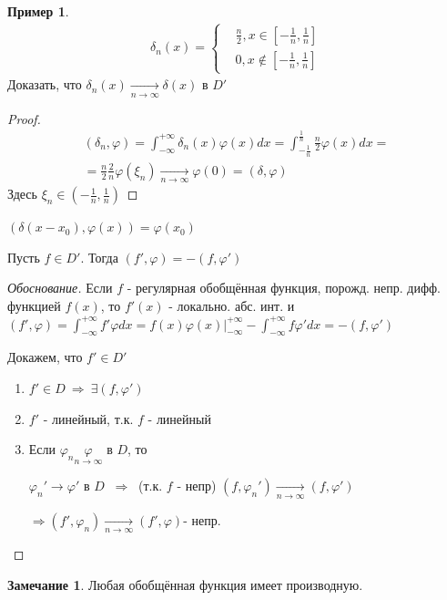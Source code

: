 \documentclass{article}
\theoremstyle{definition}
\numberwithin{theorem}{section}
\numberwithin{lemma}{section}
\numberwithin{definition}{section}
\numberwithin{corollary}{section}
\newtheorem*{eg}{Пример}
\newtheorem*{remark}{Замечание}
\numberwithin{equation}{section}
\let\phi\varphi
\let\implies\Rightarrow
\begin{document}
\begin{eg}
  \begin{gather*}
    \delta_n(x)=\left\{\begin{aligned}
      & \frac{n}{2}, x \in [-\frac{1}{n},\frac{1}{n}] \\ 
      & 0, x \not \in [-\frac{1}{n},\frac{1}{n}]
    \end{aligned}\right.
  \end{gather*}
  Доказать, что $\delta_n(x) \underset{n\to\infty}{\to}\delta(x)$ в $D'$
  \begin{proof}
    \begin{gather*}
      (\delta_n,\phi)=\int_{-\infty}^{+\infty}\delta_n(x)\phi(x)dx=\int_{-\frac{1}{n}}^{\frac{1}{n}}\frac{n}{2}\phi(x)dx = \\ 
      = \frac{n}{2}\frac{2}{n}\phi(\xi_n)\underset{n\to\infty}{\to}\phi(0)=(\delta,\phi)
    \end{gather*}
    Здесь $\xi_n\in(-\frac{1}{n},\frac{1}{n})$
  \end{proof}
\end{eg}
\begin{definition}
  $(\delta(x-x_0),\phi(x))=\phi(x_0)$
\end{definition}
\begin{definition}
  Пусть $f\in D'$. Тогда $(f',\phi)=-(f,\phi')$
\end{definition}
\begin{proof}[Обоснование]
  Если $f$ - регулярная обобщённая функция, порожд. непр. дифф. функцией $f(x)$, то
  $f'(x)$ - локально. абс. инт. и $(f',\phi)=\int_{-\infty}^{+\infty}f'\phi dx=f(x)\phi(x)\big|_{-\infty}^{+\infty}-\int_{-\infty}^{+\infty}f\phi' dx = -(f,\phi')$

  Докажем, что $f'\in D'$

  \begin{enumerate}
    \item $f' \in D \ \implies \ \exists (f,\phi')$
    \item $f'$ - линейный, т.к. $f$ - линейный
    \item Если $\phi_n \underset{n\to\infty}{\phi}$ в $D$, то

      $\phi_n' \to \phi'$ в $D$ $\ \implies \ $ (т.к. $f$ - непр) $(f,\phi_n')\underset{n\to\infty}{\to}(f,\phi')$ 

      $\implies (f',\phi_n)\underset{n\to\infty}{\to}(f',\phi)$- непр.
  \end{enumerate}
\end{proof}
\begin{remark}
  Любая обобщённая функция имеет производную.
\end{remark}
\end{document}
